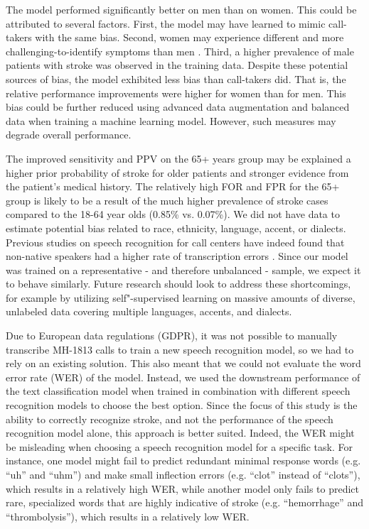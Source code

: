 {The model performed significantly better on men than on women. This could be attributed to several factors. First, the model may have learned to mimic call-takers with the same bias. Second, women may experience different and more challenging-to-identify symptoms than men \parencite{cite29,cite30}. Third, a higher prevalence of male patients with stroke was observed in the training data. Despite these potential sources of bias, the model exhibited less bias than call-takers did. That is, the relative performance improvements were higher for women than for men. This bias could be further reduced using advanced data augmentation and balanced data when training a machine learning model. However, such measures may degrade overall performance.

The improved sensitivity and PPV on the 65+ years group may be explained a higher prior probability of stroke for older patients and stronger evidence from the patient's medical history. The relatively high FOR and FPR for the 65+ group is likely to be a result of the much higher prevalence of stroke cases compared to the 18-64 year olds (0.85\% vs. 0.07\%). We did not have data to estimate potential bias related to race, ethnicity, language, accent, or dialects. Previous studies on speech recognition for call centers have indeed found that non-native speakers had a higher rate of transcription errors \parencite{han_deep_2017}. Since our model was trained on a representative - and therefore unbalanced - sample, we expect it to behave similarly. Future research should look to address these shortcomings, for example by utilizing self"-supervised learning on massive amounts of diverse, unlabeled data covering multiple languages, accents, and dialects.

Due to European data regulations (GDPR), it was not possible to manually transcribe MH-1813 calls to train a new speech recognition model, so we had to rely on an existing solution. This also meant that we could not evaluate the word error rate (WER) of the model. Instead, we used the downstream performance of the text classification model when trained in combination with different speech recognition models to choose the best option. Since the focus of this study is the ability to correctly recognize stroke, and not the performance of the speech recognition model alone, this approach is better suited. Indeed, the WER might be misleading when choosing a speech recognition model for a specific task. For instance, one model might fail to predict redundant minimal response words (e.g. “uh” and “uhm”) and make small inflection errors (e.g. “clot” instead of “clots”), which results in a relatively high WER, while another model only fails to predict rare, specialized words that are highly indicative of stroke (e.g. “hemorrhage” and “thrombolysis”), which results in a relatively low WER.

}
